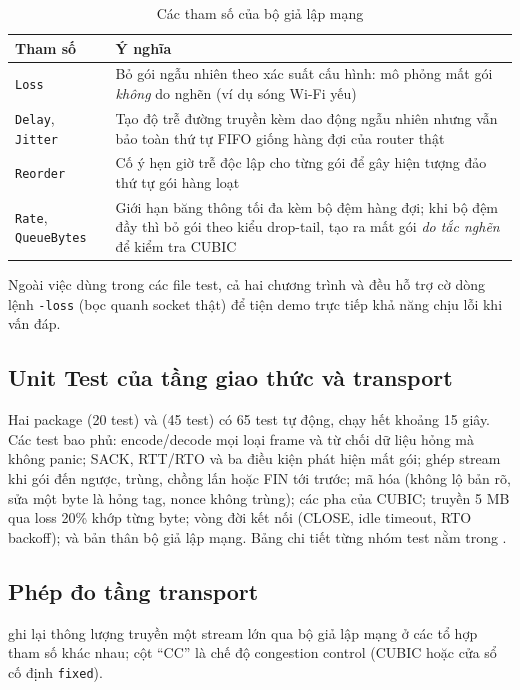 \begin{table}[H]
  \centering
  \caption{Các tham số của bộ giả lập mạng }
  \label{tab:lossy}
  \begin{tabularx}{\linewidth}{lY}
    \toprule
    \textbf{Tham số} & \textbf{Ý nghĩa} \\
    \midrule
    \texttt{Loss} & Bỏ gói ngẫu nhiên theo xác suất cấu hình: mô phỏng mất gói \emph{không} do nghẽn (ví dụ sóng
    Wi-Fi yếu) \\
    \texttt{Delay}, \texttt{Jitter} & Tạo độ trễ đường truyền kèm dao động ngẫu nhiên nhưng vẫn bảo toàn thứ tự
    FIFO giống hàng đợi của router thật \\
    \texttt{Reorder} & Cố ý hẹn giờ trễ độc lập cho từng gói để gây hiện tượng đảo thứ tự gói hàng loạt \\
    \texttt{Rate}, \texttt{QueueBytes} & Giới hạn băng thông tối đa kèm bộ đệm hàng đợi; khi bộ đệm đầy thì bỏ
    gói theo kiểu drop-tail, tạo ra mất gói \emph{do tắc nghẽn} để kiểm tra CUBIC \\
    \bottomrule
  \end{tabularx}
\end{table}

Ngoài việc dùng trong các file test, cả hai chương trình  và  đều hỗ trợ cờ dòng lệnh
\texttt{-loss} (bọc  quanh socket thật) để tiện demo trực tiếp khả năng chịu lỗi khi vấn đáp.

\subsection{Unit Test của tầng giao thức và transport}
Hai package  (20 test) và  (45 test) có 65 test tự động, chạy hết
khoảng 15 giây. Các test bao phủ: encode/decode mọi loại frame và từ chối dữ liệu hỏng mà không panic; SACK, RTT/RTO và
ba điều kiện phát hiện mất gói; ghép stream khi gói đến ngược, trùng, chồng lấn hoặc FIN tới trước; mã hóa (không lộ
bản rõ, sửa một byte là hỏng tag, nonce không trùng); các pha của CUBIC; truyền 5 MB qua loss 20\% khớp từng byte;
vòng đời kết nối (CLOSE, idle timeout, RTO backoff); và bản thân bộ giả lập mạng. Bảng chi tiết từng nhóm test nằm
trong .

\subsection{Phép đo tầng transport}
\label{subsec:do-transport}
 ghi lại thông lượng truyền một stream lớn qua bộ giả lập mạng ở các tổ hợp tham số khác
nhau; cột ``CC'' là chế độ congestion control (CUBIC hoặc cửa sổ cố định \texttt{fixed}).

